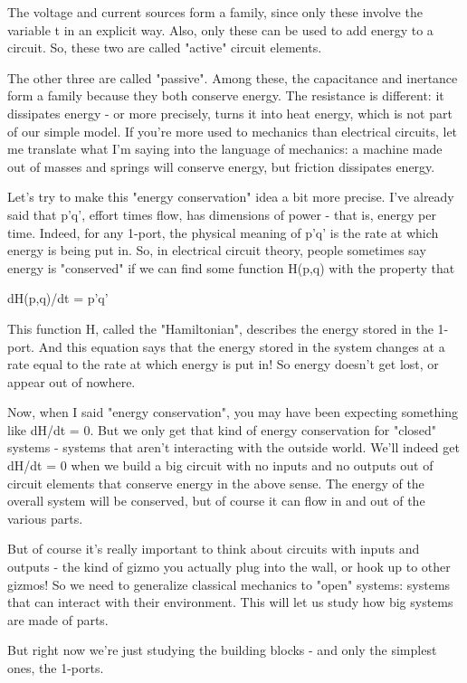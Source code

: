 The voltage and current sources form a family, since only these
involve the variable t in an explicit way.  Also, only these can be
used to add energy to a circuit.  So, these two are called
"active" circuit elements.

The other three are called "passive".  Among these, the
capacitance and inertance form a family because they both conserve
energy.  The resistance is different: it dissipates energy - or more
precisely, turns it into heat energy, which is not part of our simple
model.  If you're more used to mechanics than electrical circuits, let
me translate what I'm saying into the language of mechanics: a machine
made out of masses and springs will conserve energy, but friction
dissipates energy.

Let's try to make this "energy conservation" idea a bit more
precise.  I've already said that p'q', effort times flow, has
dimensions of power - that is, energy per time.  Indeed, for any
1-port, the physical meaning of p'q' is the rate at which energy is
being put in.  So, in electrical circuit theory, people sometimes say
energy is "conserved" if we can find some function H(p,q)
with the property that

 dH(p,q)/dt = p'q'

This function H, called the "Hamiltonian", describes the
energy stored in the 1-port.  And this equation says that the energy
stored in the system changes at a rate equal to the rate at which
energy is put in!  So energy doesn't get lost, or appear out of
nowhere.

Now, when I said "energy conservation", you may have been
expecting something like dH/dt = 0.  But we only get that kind of
energy conservation for "closed" systems - systems that
aren't interacting with the outside world.  We'll indeed get dH/dt = 0
when we build a big circuit with no inputs and no outputs out of
circuit elements that conserve energy in the above sense.  The energy
of the overall system will be conserved, but of course it can flow in
and out of the various parts.

But of course it's really important to think about circuits with
inputs and outputs - the kind of gizmo you actually plug into the
wall, or hook up to other gizmos!  So we need to generalize classical
mechanics to "open" systems: systems that can interact with their
environment.  This will let us study how big systems are made of
parts.  

But right now we're just studying the building blocks - and only the
simplest ones, the 1-ports.

